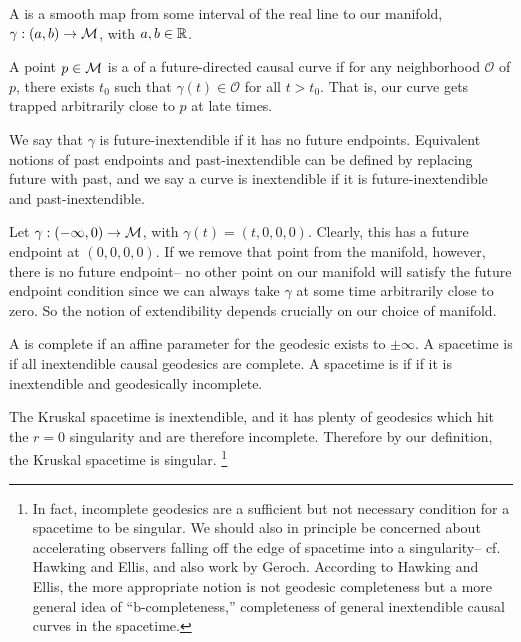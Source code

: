 \begin{defn}
    A  is a smooth map from some interval of the real line to our manifold, $\gamma:(a,b) \to \mathcal{M}$, with $a,b\in \mathbb{R}$.
\end{defn}
\begin{defn}
    A point $p\in \mathcal{M}$ is a  of a future-directed causal curve if for any neighborhood $\mathcal{O}$ of $p$, there exists $t_0$ such that $\gamma(t) \in \mathcal{O}$ for all $t>t_0$. That is, our curve gets trapped arbitrarily close to $p$ at late times.
\end{defn}
\begin{defn}
    We say that $\gamma$ is future-inextendible if it has no future endpoints. Equivalent notions of past endpoints and past-inextendible can be defined by replacing future with past, and we say a curve is inextendible if it is future-inextendible and past-inextendible.
\end{defn}
\begin{exm}
    Let $\gamma:(-\infty,0)\to \mathcal{M}$, with $\gamma(t)=(t,0,0,0)$. Clearly, this has a future endpoint at $(0,0,0,0)$. If we remove that point from the manifold, however, there is no future endpoint-- no other point on our manifold will satisfy the future endpoint condition since we can always take $\gamma$ at some time arbitrarily close to zero. So the notion of extendibility depends crucially on our choice of manifold.
\end{exm}
\begin{defn}
    A  is complete if an affine parameter for the geodesic exists to $\pm \infty$. A spacetime is  if all inextendible causal geodesics are complete. A spacetime is  if if it is inextendible and geodesically incomplete.
\end{defn}
\begin{exm}
    The Kruskal spacetime is inextendible, and it has plenty of geodesics which hit the $r=0$ singularity and are therefore incomplete. Therefore by our definition, the Kruskal spacetime is singular.%
        \footnote{In fact, incomplete geodesics are a sufficient but not necessary condition for a spacetime to be singular. We should also in principle be concerned about accelerating observers falling off the edge of spacetime into a singularity-- cf. Hawking and Ellis, and also work by Geroch. According to Hawking and Ellis, the more appropriate notion is not geodesic completeness but a more general idea of ``b-completeness,'' completeness of general inextendible causal curves in the spacetime.}
\end{exm}